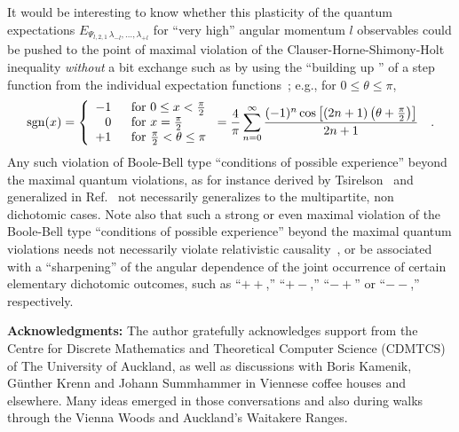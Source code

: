\documentclass[pra,amsfonts,showpacs,showkeys,preprint]{revtex4}
\begin{document}
It would be interesting to know whether this plasticity of the quantum expectations
$E_{{ \Psi_{l,2,1}}\,\lambda_{-l}, \ldots , \lambda_{+l} }$
for ``very high'' angular momentum $l$ observables
could be pushed to the point of maximal violation of
the Clauser-Horne-Shimony-Holt inequality {\em without} a  bit exchange
such as by using the
``building up '' of a step function from the individual expectation functions~\cite{svozil-krenn}; e.g., for  $0 \leq \theta \leq \pi $,
\begin{equation}
{\rm sgn} (x)
=\left\{ \begin{array}{rl}
-1 \; &\text{  for } 0\le x<\frac{\pi}{2} \\
 0 \; &\text{  for }  x=\frac{\pi}{2}  \\
+1 \; &\text{  for }  \frac{\pi}{2} <  \theta \le \pi
   \end{array} \right.
={4\over \pi }\sum_{n=0}^\infty {(-1)^n\cos \left[(2n+1)\left( \theta +\frac{\pi}{2}\right)\right]\over
2n+1}\quad .
\label{e:10}
\end{equation}
Any such violation of Boole-Bell type ``conditions of possible experience'' beyond the maximal quantum
violations, as for instance
derived by Tsirelson~\cite{cirelson} and generalized in Ref.~\cite{filipp-svo-04-qpoly-prl} not necessarily generalizes
to the multipartite, non dichotomic cases.
Note also that such a strong or even maximal violation of the Boole-Bell type ``conditions of possible experience'' beyond the maximal quantum
violations
needs
not necessarily violate relativistic causality~\cite{popescu-97,popescu-97b},
or be associated with a ``sharpening'' of the angular dependence of the joint occurrence of certain elementary dichotomic outcomes,
such as  ``$++$,'' ``$+-$,'' ``$-+$'' or ``$--$,'' respectively.

{\bf Acknowledgments:}
The author gratefully acknowledges support from the Centre for Discrete Mathematics and Theoretical Computer Science (CDMTCS) of
The University of Auckland, as well as discussions with Boris Kamenik, G\"unther Krenn and Johann Summhammer in Viennese coffee houses and elsewhere.
Many ideas emerged in those conversations and also during walks through the Vienna Woods and Auckland's Waitakere Ranges.


%
%
\end{document}
